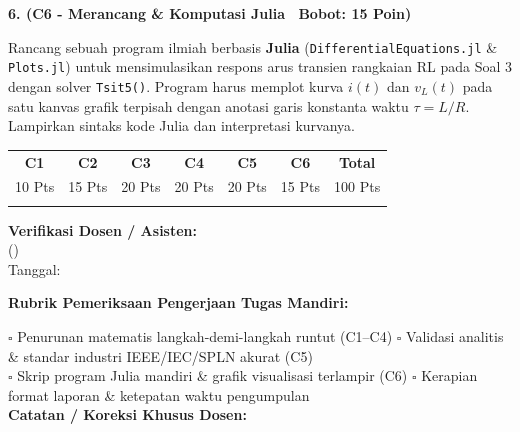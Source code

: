 \documentclass[10pt,a4paper]{article}
\begin{document}
\vspace{3.5mm}

\noindent\textbf{6. (C6 - Merancang \& Komputasi Julia \textbar\ Bobot: 15 Poin)}\par\vspace{0.8mm}
{\footnotesize Rancang sebuah program ilmiah berbasis \textbf{Julia} (\texttt{Differential\-Equations.jl} \& \texttt{Plots.jl}) untuk mensimulasikan respons arus transien rangkaian RL pada Soal 3 dengan solver \texttt{Tsit5()}. Program harus memplot kurva $i(t)$ dan $v_L(t)$ pada satu kanvas grafik terpisah dengan anotasi garis konstanta waktu $\tau = L/R$. Lampirkan sintaks kode Julia dan interpretasi kurvanya.}\par

\vfill

\noindent\begin{minipage}[b]{0.62\textwidth}%
  \centering
  \scriptsize
  \begin{tabular}{|c|c|c|c|c|c|c|}
    \hline
    \rowcolor{unibblue}
    \textbf{\color{white}C1} & \textbf{\color{white}C2} & \textbf{\color{white}C3} & \textbf{\color{white}C4} & \textbf{\color{white}C5} & \textbf{\color{white}C6} & \textbf{\color{white}Total} \\
    \rowcolor{unibblue!10}
    10 Pts & 15 Pts & 20 Pts & 20 Pts & 20 Pts & 15 Pts & 100 Pts \\
    \hline
    & & & & & & \\[3mm]
    \hline
  \end{tabular}%
\end{minipage}%
\hfill%
\begin{minipage}[b]{0.35\textwidth}%
  \centering
  \scriptsize
  \textbf{Verifikasi Dosen / Asisten:}\\[6mm]
  (\dotfill)\\[1mm]
  \tiny Tanggal: \dotfill
\end{minipage}\par

\vspace{2mm}
\begin{tcolorbox}[colback=white,colframe=unibblue!40!black,colbacktitle=unibblue!10,coltitle=unibblue,boxrule=0.5pt,arc=2pt,left=5pt,right=5pt,top=3pt,bottom=3pt,title=\textbf{\tiny Catatan Evaluasi \& Umpan Balik Dosen Pengampu}]
  \tiny
  \textbf{Rubrik Pemeriksaan Pengerjaan Tugas Mandiri:}\par\vspace{0.8mm}
  $\square$ Penurunan matematis langkah-demi-langkah runtut (C1--C4) \hfill $\square$ Validasi analitis \& standar industri IEEE/IEC/SPLN akurat (C5)\\[0.8mm]
  $\square$ Skrip program Julia mandiri \& grafik visualisasi terlampir (C6) \hfill $\square$ Kerapian format laporan \& ketepatan waktu pengumpulan\\[2.0mm]
  \textbf{Catatan / Koreksi Khusus Dosen:}\\[1.6cm]
\end{tcolorbox}
\end{document}

